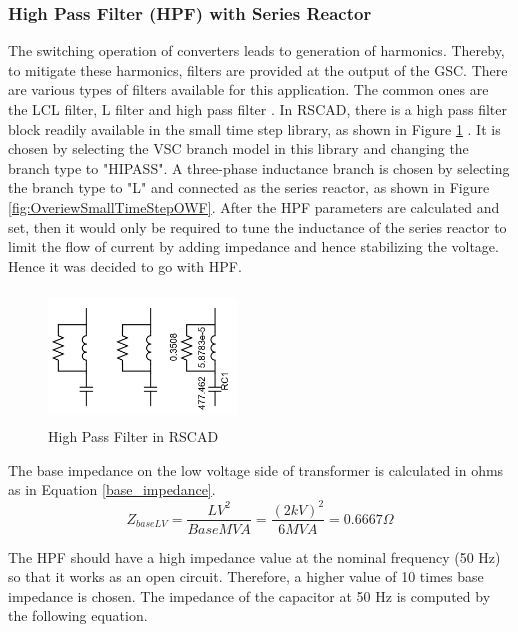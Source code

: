 \subsubsection{High Pass Filter (HPF) with Series Reactor}\label{HPF_design}
The switching operation of converters leads to generation of harmonics. Thereby, to mitigate these harmonics, filters are provided at the output of the \gls{GSC}. There are various types of filters available for this application. The common ones are the LCL filter, L filter and high pass filter \cite{beres_review_2016}. In RSCAD, there is a high pass filter block readily available in the small time step library, as shown in Figure \ref{fig:HPF} \cite{rtds_tech}. It is chosen by selecting the \gls{VSC} branch model in this library and changing the branch type to "HIPASS". A three-phase inductance branch is chosen by selecting the branch type to "L" and connected as the series reactor, as shown in Figure \ref{fig:OveriewSmallTimeStepOWF}. After the \gls{HPF} parameters are calculated and set, then it would only be required to tune the inductance of the series reactor to limit the flow of current by adding impedance and hence stabilizing the voltage. Hence it was decided to go with \gls{HPF}.

\begin{figure}[H]
\centering
    \includegraphics[height = 3.5cm,width = 5cm]{Diagrams/Chapter_3/HPF_RSCAD.PNG}
    \caption{High Pass Filter in RSCAD}
    \label{fig:HPF}
\end{figure}

The base impedance on the low voltage side of transformer is calculated in ohms as in Equation \ref{base_impedance}.
\begin{equation}\label{base_impedance}
    Z_{baseLV} = \frac{LV^2}{Base MVA} = \frac{(2 kV)^2}{6 MVA} = 0.6667\Omega  
\end{equation}

The \gls{HPF} should have a high impedance value at the nominal frequency (50 Hz) so that it works as an open circuit. Therefore, a higher value of 10 times base impedance is chosen. The impedance of the capacitor at 50 Hz is computed by the following equation.

